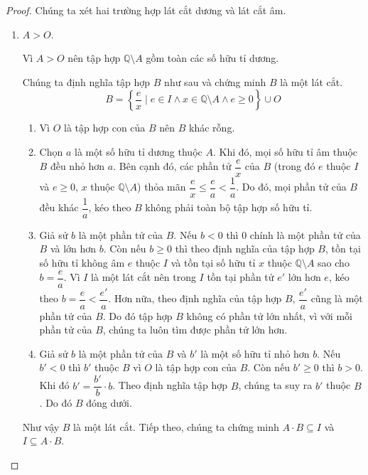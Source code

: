 \begin{proof}
    Chúng ta xét hai trường hợp lát cắt dương và lát cắt âm.
    \begin{enumerate}[label={\textbf{Trường hợp \arabic*.}},itemindent=2cm]
        \item $A > O$.

              Vì $A > O$ nên tập hợp $\mathbb{Q}\setminus A$ gồm toàn các số hữu tỉ dương.

              Chúng ta định nghĩa tập hợp $B$ như sau và chứng minh $B$ là một lát cắt.
              \[
                  B = \left\{ \frac{e}{x} \mid e\in I \wedge x\in \mathbb{Q}\setminus A\wedge e\geq 0 \right\}\cup O
              \]

              \begin{enumerate}[label={(DC\arabic*)}]
                  \item Vì $O$ là tập hợp con của $B$ nên $B$ khác rỗng.
                  \item Chọn $a$ là một số hữu tỉ dương thuộc $A$. Khi đó, mọi số hữu tỉ âm thuộc $B$ đều nhỏ hơn $a$. Bên cạnh đó, các phần tử $\dfrac{e}{x}$ của $B$ (trong đó $e$ thuộc $I$ và $e\geq 0$, $x$ thuộc $\mathbb{Q}\setminus A$) thỏa mãn $\dfrac{e}{x}\leq \dfrac{e}{a} < \dfrac{1}{a}$. Do đó, mọi phần tử của $B$ đều khác $\dfrac{1}{a}$, kéo theo $B$ không phải toàn bộ tập hợp số hữu tỉ.
                  \item Giả sử $b$ là một phần tử của $B$. Nếu $b < 0$ thì $0$ chính là một phần tử của $B$ và lớn hơn $b$. Còn nếu $b\geq 0$ thì theo định nghĩa của tập hợp $B$, tồn tại số hữu tỉ không âm $e$ thuộc $I$ và tồn tại số hữu tỉ $x$ thuộc $\mathbb{Q}\setminus A$ sao cho $b = \dfrac{e}{a}$. Vì $I$ là một lát cắt nên trong $I$ tồn tại phần tử $e'$ lớn hơn $e$, kéo theo $b = \dfrac{e}{a} < \dfrac{e'}{a}$. Hơn nữa, theo định nghĩa của tập hợp $B$, $\dfrac{e'}{a}$ cũng là một phần tử của $B$. Do đó tập hợp $B$ không có phần tử lớn nhất, vì với mỗi phần tử của $B$, chúng ta luôn tìm được phần tử lớn hơn.
                  \item Giả sử $b$ là một phần tử của $B$ và $b'$ là một số hữu tỉ nhỏ hơn $b$. Nếu $b' < 0$ thì $b'$ thuộc $B$ vì $O$ là tập hợp con của $B$. Còn nếu $b'\geq 0$ thì $b > 0$. Khi đó $b' = \dfrac{b'}{b}\cdot b$. Theo định nghĩa tập hợp $B$, chúng ta suy ra $b'$ thuộc $B$. Do đó $B$ đóng dưới.
              \end{enumerate}

              Như vậy $B$ là một lát cắt. Tiếp theo, chúng ta chứng minh $A\cdot B \subseteq I$ và $I\subseteq A\cdot B$.


\end{enumerate}
\end{proof}
